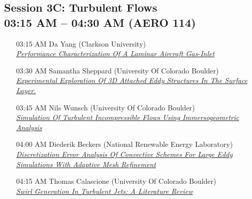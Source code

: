 \subsection*{Session 3C: Turbulent Flows \\ 03:15 AM  -- 04:30 AM (AERO 114)}
\begin{enumerate}
\item [03:15 AM] Da Yang (Clarkson University) \\ \hyperlink{DaYang}{\it Performance Characterization Of A Laminar Aircraft Gas-Inlet }
\item [03:30 AM] Samantha Sheppard (University Of Colorado Boulder) \\ \hyperlink{SamanthaSheppard}{\it Experimental Exploration Of 3D Attached Eddy Structures In The Surface Layer. }
\item [03:45 AM] Nils Wunsch (University Of Colorado Boulder) \\ \hyperlink{NilsWunsch}{\it Simulation Of Turbulent Incompressible Flows Using Immersogeometric Analysis }
\item [04:00 AM] Diederik Beckers (National Renewable Energy Laboratory) \\ \hyperlink{DiederikBeckers}{\it Discretization Error Analysis Of Convective Schemes For Large Eddy Simulations With Adaptive Mesh Refinement }
\item [04:15 AM] Thomas Calascione (University Of Colorado Boulder) \\ \hyperlink{ThomasCalascione}{\it Swirl Generation In Turbulent Jets: A Literature Review }
\end{enumerate}
